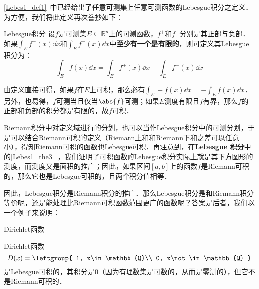

\autoref{Lebes1_def1}~中已经给出了任意可测集上任意可测函数的Lebesgue积分之定义．为方便，我们将此定义再次誊抄如下：

\begin{definition}{Lebesgue积分}
设$f$是可测集$E\subseteq\mathbb{R}^n$上的可测函数，$f^+$和$f^-$分别是其正部与负部．如果$\int_E f^+(x) \dd x$和$\int_E f^-(x) \dd x$中\textbf{至少有一个是有限的}，则可定义其Lebesgue积分为：
\begin{equation}
\int_E f(x) \dd x = \int_E f^+(x) \dd x - \int_E f^-(x) \dd x
\end{equation}
\end{definition}

由定义直接可得，如果$f$在$E$上可积，那么必有$\int_E -f(x) \dd x = -\int_E f(x) \dd x$．另外，也易得，$f$可测当且仅当$\abs{f}$可测；如果$E$测度有限且$f$有界，那么$f$的正部和负部的积分都是有限的，故$f$可积．



Riemann积分中对定义域进行的分划，也可以当作Lebesgue积分中的可测分划，于是可以结合Riemann可积的定义（Riemann上和和Riemann下和之差可以任意小），得知Riemann可积的函数也Lebesgue可积．再注意到，在\textbf{Lebesgue 积分}中的\autoref{Lebes1_the3}~，我们证明了可积函数的Lebesgue积分实际上就是其下方图形的测度，而测度又是面积的推广；因此，如果区间$[a, b]$上的函数$f$是Riemann可积的，那么它也是Lebesgue可积的，且两个积分值相等．

因此，Lebesgue积分是Riemann积分的推广．那么Lebesgue积分是和Riemann积分等价呢，还是能处理比Riemann可积函数范围更广的函数呢？答案是后者，我们以一个例子来说明：

\begin{example}{Dirichlet函数}

Dirichlet函数
\begin{equation}
D(x)=
\leftgroup{
    1, x\in\mathbb{Q}\\
    0, x\not\in\mathbb{Q}
}
\end{equation}
是Lebesgue可积的，其积分是$0$（因为有理数集是可数的，从而是零测的），但它不是Riemann可积的．

\end{example}
















